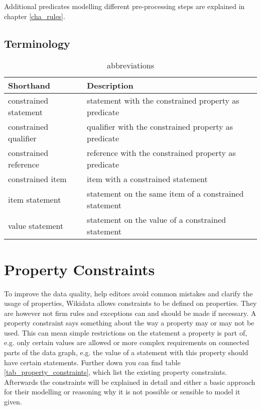 \documentclass[hyperref,bachelorofscience,fleqn]{cgvpub}
\begin{document}
Additional predicates modelling different pre-processing steps are explained in chapter \ref{cha_rules}.
\section{Terminology}
\begin{table}[H]
\caption{abbreviations}
\begin{tabular}{ll}
Shorthand & Description \\
\hline
constrained statement & statement with the constrained property as predicate \\
constrained qualifier & qualifier with the constrained property as predicate \\
constrained reference & reference with the constrained property as predicate \\
constrained item & item with a constrained statement \\
item statement & statement on the same item of a constrained statement \\
value statement & statement on the value of a constrained statement
\end{tabular}
\end{table}
\chapter{Property Constraints}

To improve the data quality, help editors avoid common mistakes and clarify the usage of properties, Wikidata allows constraints to be defined on properties. They are however not firm rules and exceptions can and should be made if necessary. A property constraint says something about the way a property may or may not be used. This can mean simple restrictions on the statement a property is part of, e.g. only certain values are allowed or more complex requirements on connected parts of the data graph, e.g. the value of a statement with this property should have certain statements. Further down you can find table \ref{tab_property_constraints}, which list the existing property constraints. Afterwards the constraints will be explained in detail and either a basic approach for their modelling or reasoning why it is not possible or sensible to model it given.\\
\end{document}
